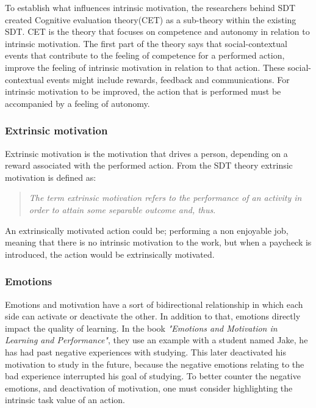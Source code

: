 To establish what influences intrinsic motivation, the researchers behind SDT\cite{SDT} created Cognitive evaluation theory(CET) as a sub-theory within the existing SDT. CET is the theory that focuses on competence and autonomy in relation to intrinsic motivation. The first part of the theory says that social-contextual events that contribute to the feeling of competence for a performed action, improve the feeling of intrinsic motivation in relation to that action\cite[p.~70]{SDT}. These social-contextual events might include rewards, feedback and communications\cite[p.~70]{SDT}. For intrinsic motivation to be improved, the action that is performed must be accompanied by a feeling of autonomy\cite[p.~70]{SDT}.

\subsubsection*{Extrinsic motivation}
Extrinsic motivation is the motivation that drives a person, depending on a reward associated with the performed action. From the SDT theory extrinsic motivation is defined as: 
\begin{quote}
	\textit{The term extrinsic motivation refers to the performance of an activity in order to attain some separable outcome and, thus}\cite[p.~71]{SDT}.\\
\end{quote}
An extrinsically motivated action could be; performing a non enjoyable job, meaning that there is no intrinsic motivation to the work, but when a paycheck is introduced, the action would be extrinsically motivated.

\subsubsection*{Emotions}
Emotions and motivation have a sort of bidirectional relationship in which each side can activate or deactivate the other\cite[p.~66]{emotionsAndMotivation}. In addition to that, emotions directly impact the quality of learning\cite[p.~66]{emotionsAndMotivation}. In the book \textit{"Emotions and Motivation in Learning and Performance"}\cite{emotionsAndMotivation}, they use an example with a student named Jake, he has had past negative experiences with studying. This later deactivated his motivation to study in the future, because the negative emotions relating to the bad experience interrupted his goal of studying\cite[p.~67]{emotionsAndMotivation}. To better counter the negative emotions, and deactivation of motivation, one must consider highlighting the intrinsic task value of an action\cite[p.68]{emotionsAndMotivation}.

